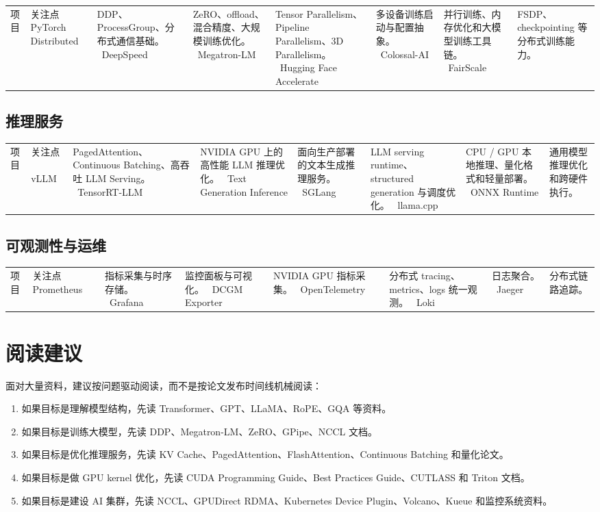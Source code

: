 \begin{longtable}{p{}p{}}
\toprule
项目 & 关注点 \
\midrule
PyTorch Distributed & DDP、ProcessGroup、分布式通信基础。 \
DeepSpeed & ZeRO、offload、混合精度、大规模训练优化。 \
Megatron-LM & Tensor Parallelism、Pipeline Parallelism、3D Parallelism。 \
Hugging Face Accelerate & 多设备训练启动与配置抽象。 \
Colossal-AI & 并行训练、内存优化和大模型训练工具链。 \
FairScale & FSDP、checkpointing 等分布式训练能力。 \
\bottomrule
\end{longtable}

\subsection{推理服务}

\begin{longtable}{p{0.26\textwidth}p{}}
\toprule
项目 & 关注点 \
\midrule
vLLM & PagedAttention、Continuous Batching、高吞吐 LLM Serving。 \
TensorRT-LLM & NVIDIA GPU 上的高性能 LLM 推理优化。 \
Text Generation Inference & 面向生产部署的文本生成推理服务。 \
SGLang & LLM serving runtime、structured generation 与调度优化。 \
llama.cpp & CPU / GPU 本地推理、量化格式和轻量部署。 \
ONNX Runtime & 通用模型推理优化和跨硬件执行。 \
\bottomrule
\end{longtable}

\subsection{可观测性与运维}

\begin{longtable}{p{0.26\textwidth}p{0.64\textwidth}}
\toprule
项目 & 关注点 \
\midrule
Prometheus & 指标采集与时序存储。 \
Grafana & 监控面板与可视化。 \
DCGM Exporter & NVIDIA GPU 指标采集。 \
OpenTelemetry & 分布式 tracing、metrics、logs 统一观测。 \
Loki & 日志聚合。 \
Jaeger & 分布式链路追踪。 \
\bottomrule
\end{longtable}

\section{阅读建议}

面对大量资料，建议按问题驱动阅读，而不是按论文发布时间线机械阅读：

\begin{enumerate}
\item 如果目标是理解模型结构，先读 Transformer、GPT、LLaMA、RoPE、GQA 等资料。
\item 如果目标是训练大模型，先读 DDP、Megatron-LM、ZeRO、GPipe、NCCL 文档。
\item 如果目标是优化推理服务，先读 KV Cache、PagedAttention、FlashAttention、Continuous Batching 和量化论文。
\item 如果目标是做 GPU kernel 优化，先读 CUDA Programming Guide、Best Practices Guide、CUTLASS 和 Triton 文档。
\item 如果目标是建设 AI 集群，先读 NCCL、GPUDirect RDMA、Kubernetes Device Plugin、Volcano、Kueue 和监控系统资料。
\end{enumerate}

